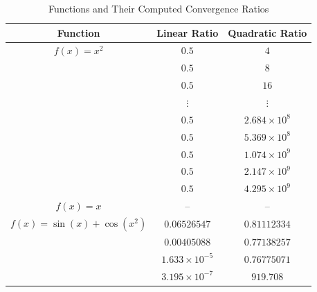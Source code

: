 \documentclass[12pt]{article}
\begin{document}
\begin{table}[H]
\centering
\begin{tabular}{c|c|c}
\toprule
Function & Linear Ratio & Quadratic Ratio \\
\midrule

$f(x)=x^2$ & $0.5$ & $4$ \\
         & $0.5$ & $8$ \\
         & $0.5$ & $16$ \\
         & $\vdots$ & $\vdots$ \\
         & $0.5$ & $2.684\times10^8$ \\
         & $0.5$ & $5.369\times10^8$ \\
         & $0.5$ & $1.074\times10^9$ \\
         & $0.5$ & $2.147\times10^9$ \\
         & $0.5$ & $4.295\times10^9$ \\

\midrule

$f(x)=x$ & -- & -- \\

\midrule

$f(x)=\sin(x)+\cos(x^2)$
& $0.06526547$ & $0.81112334$ \\
& $0.00405088$ & $0.77138257$ \\
& $1.633\times10^{-5}$ & $0.76775071$ \\
& $3.195\times10^{-7}$ & $919.708$ \\

\bottomrule
\end{tabular}
\caption{Functions and Their Computed Convergence Ratios}
\label{tab:1}
\end{table}
\end{document}
